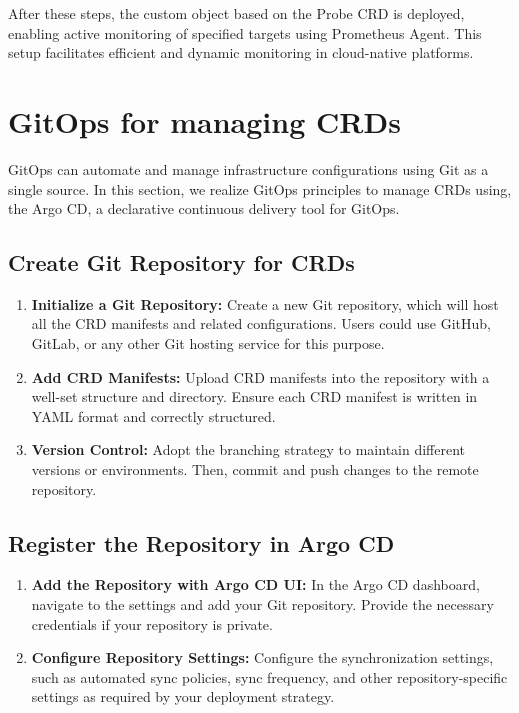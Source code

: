 After these steps, the custom object based on the Probe \ac{CRD} is deployed, enabling active monitoring of specified targets using Prometheus Agent. This setup facilitates efficient and dynamic monitoring in cloud-native platforms. 

\section{GitOps for managing \ac{CRD}s}

GitOps can automate and manage infrastructure configurations using Git as a single source. In this section, we realize GitOps principles to manage \ac{CRD}s using, the Argo CD, a declarative continuous delivery tool for GitOps. 

\subsection{Create Git Repository for \ac{CRD}s}

\begin{enumerate}
    \item \textbf{Initialize a Git Repository:} Create a new Git repository, which will host all the \ac{CRD} manifests and related configurations. Users could use GitHub, GitLab, or any other Git hosting service for this purpose.
    \item \textbf{Add \ac{CRD} Manifests:} Upload \ac{CRD} manifests into the repository with a well-set structure and directory. Ensure each \ac{CRD} manifest is written in YAML format and correctly structured.
    \item \textbf{Version Control:} Adopt the branching strategy to maintain different versions or environments. Then, commit and push changes to the remote repository. 
\end{enumerate}

\subsection{Register the Repository in Argo CD}

\begin{enumerate}
    \item \textbf{Add the Repository with Argo CD UI:} In the Argo CD dashboard, navigate to the settings and add your Git repository. Provide the necessary credentials if your repository is private. 
    \item \textbf{Configure Repository Settings:} Configure the synchronization settings, such as automated sync policies, sync frequency, and other repository-specific settings as required by your deployment strategy. 
\end{enumerate}


